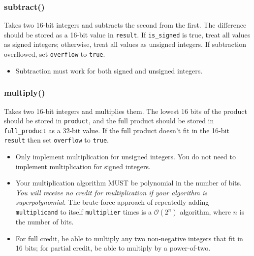 \subsubsection*{subtract()} Takes two 16-bit integers and subtracts the second
from the first.  The difference should be stored as a 16-bit value in
\lstinline{result}.  If \lstinline{is_signed} is true, treat all values as
signed integers; otherwise, treat all values as unsigned integers.  If
subtraction overflowed, set \lstinline{overflow} to \lstinline{true}.
\begin{itemize}
\item Subtraction must work for both signed and unsigned integers.
\end{itemize}

\subsubsection*{multiply()} Takes two 16-bit integers and multiplies them.  The
lowest 16 bits of the product should be stored in \lstinline{product}, and the
full product should be stored in \lstinline{full_product} as a 32-bit value.
If the full product doesn't fit in the 16-bit \lstinline{result} then set
\lstinline{overflow} to \lstinline{true}.
\begin{itemize}
\item Only implement multiplication for unsigned integers.  You do not need to
    implement multiplication for signed integers.
\item Your multiplication algorithm MUST be polynomial in the number of bits.
    \textit{You will receive no credit for multiplication if your algorithm is
    superpolynomial.} The brute-force approach of repeatedly adding
    \lstinline{multiplicand} to itself \lstinline{multiplier} times is a
    $\mathcal{O}(2^n)$ algorithm, where $n$ is the number of bits.
\item For full credit, be able to multiply any two non-negative integers that
    fit in 16 bits; for partial credit, be able to multiply by a power-of-two.
\end{itemize}

